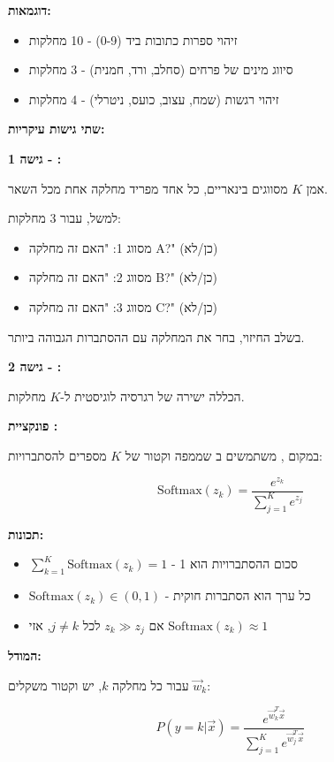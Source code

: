 \textbf{דוגמאות:}
\begin{itemize}
\item זיהוי ספרות כתובות ביד (\num{0}-\num{9}) - \num{10} מחלקות
\item סיווג מינים של פרחים (סחלב, ורד, חמנית) - \num{3} מחלקות
\item זיהוי רגשות (שמח, עצוב, כועס, ניטרלי) - \num{4} מחלקות
\end{itemize}

\textbf{שתי גישות עיקריות:}

\textbf{גישה \num{1} - :}

אמן $K$ מסווגים בינאריים, כל אחד מפריד מחלקה אחת מכל השאר.

למשל, עבור \num{3} מחלקות:
\begin{itemize}
\item מסווג \num{1}: "האם זה מחלקה A?" (כן/לא)
\item מסווג \num{2}: "האם זה מחלקה B?" (כן/לא)
\item מסווג \num{3}: "האם זה מחלקה C?" (כן/לא)
\end{itemize}

בשלב החיזוי, בחר את המחלקה עם ההסתברות הגבוהה ביותר.

\textbf{גישה \num{2} - :}

הכללה ישירה של רגרסיה לוגיסטית ל-$K$ מחלקות.

\textbf{פונקציית :}

במקום , משתמשים ב שממפה וקטור של $K$ מספרים להסתברויות:

\begin{equation}
\text{Softmax}(z_k) = \frac{e^{z_k}}{\sum_{j=1}^{K} e^{z_j}}
\end{equation}

\textbf{תכונות:}
\begin{itemize}
\item $\sum_{k=1}^{K} \text{Softmax}(z_k) = 1$ - סכום ההסתברויות הוא \num{1}
\item $\text{Softmax}(z_k) \in (0, 1)$ - כל ערך הוא הסתברות חוקית
\item אם $z_k \gg z_j$ לכל $j \neq k$, אזי $\text{Softmax}(z_k) \approx 1$
\end{itemize}

\textbf{המודל:}

עבור כל מחלקה $k$, יש וקטור משקלים $\vec{w}_k$:

\begin{equation}
P(y=k|\vec{x}) = \frac{e^{\vec{w}_k^T\vec{x}}}{\sum_{j=1}^{K} e^{\vec{w}_j^T\vec{x}}}
\end{equation}

